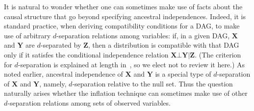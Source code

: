 It is natural to wonder whether one can sometimes make use of facts about the causal structure that go beyond specifying ancestral independences.  Indeed, it is standard practice, when deriving compatibility conditions for a DAG, to make use of arbitrary $d$-separation relations among variables: if, in a given DAG, $\bm{X}$ and $\bm{Y}$ are $d$-separated by $\bm{Z}$, then a distribution is compatible with that DAG only if it satisfes the conditional independence relation $\bm{X}\bot\bm{Y}|\bm{Z}$. (The criterion for $d$-separation is explained at length in~\cite{pearl2009causality,studeny2005probabilistic,WoodSpekkens,pusey2014gdag}, so we elect not to review it here.)  As noted earlier, ancestral independence of $\bm{X}$ and $\bm{Y}$ is a special type of $d$-separation of $\bm{X}$ and $\bm{Y}$, namely, $d$-separation relative to the null set.  Thus the question naturally arises whether the inflation technique can sometimes make use of other $d$-separation relations among sets of observed variables.




